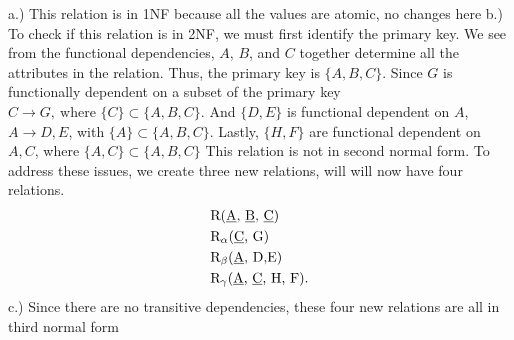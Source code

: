 \documentclass{report}
\begin{document}
    
    \bigbreak \noindent 
    a.) This relation is in 1NF because all the values are atomic, no changes here
    \bigbreak \noindent 
    b.) To check if this relation is in 2NF, we must first identify the primary key. We see from the functional dependencies, $A$, $B$, and $C$ together determine all the attributes in the relation. Thus, the primary key is $\{A, B, C\}$. Since $G$ is functionally dependent on a subset of the primary key $C \to G,\ \text{where } \{C\} \subset \{A,B,C\} $. And $\{D,E\}$ is functional dependent on $A$, $A \to D,E$, with $\{A\} \subset \{A,B,C\}$. Lastly, $\{H,F\}$ are functional dependent on $A,C$, where $\{A,C\} \subset \{A,B,C\}$ This relation is not in second normal form.
    \bigbreak \noindent 
    To address these issues, we create three new relations, will will now have four relations.
    \begin{align*}
        &\text{R(\underline{A}, \underline{B}, \underline{C})} \\
        &\text{R$_{\alpha}$(\underline{C}, G)} \\
        &\text{R$_{\beta}$(\underline{A}, D,E)}  \\
        &\text{R$_{\gamma}$(\underline{A}, \underline{C}, H, F)}
    .\end{align*}
    \bigbreak \noindent 
    c.) Since there are no transitive dependencies, these four new relations are all in third normal form
\end{document}
